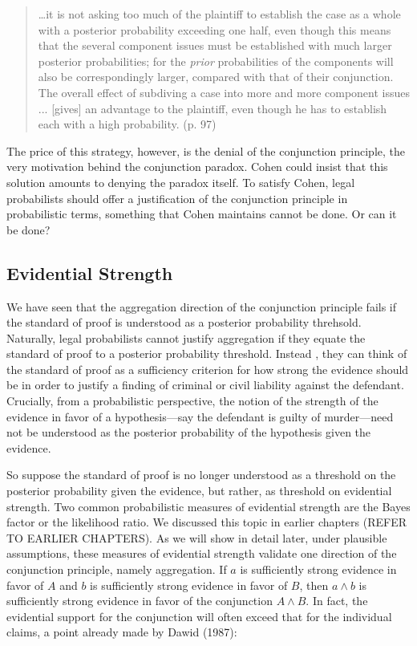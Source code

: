 \documentclass[10pt,dvipsnames,enabledeprecatedfontcommands]{scrartcl}
\begin{document}
\begin{quote}
\dots it is not asking too much of the plaintiff to establish the case as a whole with a posterior probability exceeding one half, even though this means  that the several component issues must be established with much larger posterior probabilities; for the \textit{prior}  probabilities of the components will also be correspondingly larger, compared with that of their conjunction. The overall effect of subdiving a case into more and more component issues ... [gives] an advantage to the plaintiff, even though he has to establish each with a high probability. (p. 97)
 \end{quote}

\noindent  The price of this strategy, however, is the denial of the
conjunction principle, the very motivation behind the conjunction
paradox. Cohen could insist that this solution amounts to denying the
paradox itself. To satisfy Cohen, legal probabilists should offer a
justification of the conjunction principle in probabilistic terms,
something that Cohen maintains cannot be done. Or can it be done?

\hypertarget{evidential-strength}{%
\subsection{Evidential Strength}\label{evidential-strength}}

We have seen that the aggregation direction of the conjunction principle
fails if the standard of proof is understood as a posterior probability
threhsold. Naturally, legal probabilists cannot justify aggregation if
they equate the standard of proof to a posterior probability threshold.
Instead , they can think of the standard of proof as a sufficiency
criterion for how strong the evidence should be in order to justify a
finding of criminal or civil liability against the defendant. Crucially,
from a probabilistic perspective, the notion of the strength of the
evidence in favor of a hypothesis---say the defendant is guilty of
murder---need not be understood as the posterior probability of the
hypothesis given the evidence.

So suppose the standard of proof is no longer understood as a threshold
on the posterior probability given the evidence, but rather, as
threshold on evidential strength. Two common probabilistic measures of
evidential strength are the Bayes factor or the likelihood ratio. We
discussed this topic in earlier chapters (REFER TO EARLIER CHAPTERS). As
we will show in detail later, under plausible assumptions, these
measures of evidential strength validate one direction of the
conjunction principle, namely aggregation. If \(a\) is sufficiently
strong evidence in favor of \(A\) and \(b\) is sufficiently strong
evidence in favor of \(B\), then \(a\wedge b\) is sufficiently strong
evidence in favor of the conjunction \(A \wedge B\). In fact, the
evidential support for the conjunction will often exceed that for the
individual claims, a point already made by Dawid (1987):
\end{document}
